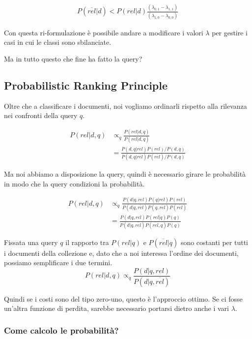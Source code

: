 \begin{align*}
P(\overline{rel}|d) < P(rel|d) \frac{(\lambda_{0,1} - \lambda_{1,1})}{(\lambda_{1,0} - \lambda_{0,0})}
\end{align*}

\noindent Con questa ri-formulazione è possibile andare a modificare i valori $\lambda$ per gestire i casi in cui le classi sono sbilanciate.

Ma in tutto questo che fine ha fatto la query?

\subsection{Probabilistic Ranking Principle}

Oltre che a classificare i documenti, noi vogliamo ordinarli rispetto alla rilevanza nei confronti della query $q$.

\begin{align*}
P(rel | d, q) &\propto_q \frac{P(rel | d,q)}{P(\overline{rel} | d,q)} \\
			  &=\frac{ P(d,q|rel)P(rel) / P(d,q)}{P(d,q|\overline{rel})P(\overline{rel})/P(d,q)}
\end{align*}

\noindent Ma noi abbiamo a disposizione la query, quindi è necessario girare le probabilità in modo che la query condizioni la probabilità.

\begin{align*}
P(rel | d, q) &\propto_q \frac{P(d|q,rel)P(q|rel)P(rel)}{P(d|q,\overline{rel})P(q,\overline{rel})P(\overline{rel})} \\
			  &=\frac{P(d|q,rel)P(rel|q)P(q)}{P(d|q,\overline{rel})P(\overline{rel},q)P(q)}
\end{align*}

\noindent Fissata una query $q$ il rapporto tra $P(rel|q)$ e $P(\overline{rel}|q)$ sono costanti per tutti i documenti della collezione e, dato che a noi interessa l'ordine dei documenti, possiamo semplificare i due termini.\\

$$
P(rel | d,q) \propto_q \frac{P(d|q,rel)}{P(d|q,\overline{rel})}
$$

\noindent Quindi se i costi sono del tipo zero-uno, questo è l'approccio ottimo. Se ci fosse un'altra funzione di perdita, sarebbe necessario portarsi dietro anche i vari $\lambda$.

\subsubsection{Come calcolo le probabilità?}

